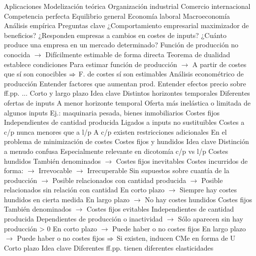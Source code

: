 \documentclass{nuevotema}
\begin{document}
\begin{esquemal}
		\2 Aplicaciones
			\3 Modelización teórica
				\4 Organización industrial
				\4 Comercio internacional
				\4 Competencia perfecta
				\4 Equilibrio general
				\4 Economía laboral
				\4 Macroeconomía
			\3 Análisis empírica
				\4 Preguntas clave
				\4[] ¿Comportamiento empresarial maximizador de beneficios?
				\4[] ¿Responden empresas a cambios en costes de inputs?
				\4[] ¿Cuánto produce una empresa en un mercado determinado?
				\4 Función de producción no conocida
				\4[] $\to$ Difícilmente estimable de forma directa
				\4 Teorema de dualidad establece condiciones
				\4[] Para estimar función de producción
				\4[] $\to$ A partir de costes que sí son conocibles
				\4[] $\Rightarrow$ F. de costes sí son estimables
				\4 Análisis econométrico de producción
				\4[] Entender factores que aumentan prod.
				\4[] Entender efectos precio sobre ff.pp.
				\4[] ...
	\1 
		\2 Corto y largo plazo
			\3 Idea clave
				\4 Distintos horizontes temporales
				\4[$\to$] Diferentes ofertas de inputs
				\4 A menor horizonte temporal
				\4[$\to$] Oferta más inelástica o limitada de algunos inputs
				\4[$\to$] Ej.: maquinaria pesada, bienes inmobiliarios
				\4 Costes fijos
				\4[] Independientes de cantidad producida
				\4[$\to$] Ligados a inputs no sustituibles
				\4 Costes a c/p nunca menores que a l/p
				\4[$\to$] A c/p existen restricciones adicionales
				\4[$\to$] En el problema de minimización de costes
			\3 Costes fijos y hundidos
				\4 Idea clave
				\4[] Distinción a menudo confusa
				\4[] Especialmente relevante en dicotomía c/p vs l/p
				\4 Costes hundidos
				\4[] También denominados
				\4[] $\to$ Costes fijos inevitables
				\4[] Costes incurridos de forma:
				\4[] $\to$ Irrevocable
				\4[] $\to$ Irrecuperable
				\4[] Sin supuestos sobre cuantía de la producción
				\4[] $\to$ Posible relacionados con cantidad producida
				\4[] $\to$ Posible relacionados sin relación con cantidad
				\4[] En corto plazo
				\4[] $\to$ Siempre hay costes hundidos en cierta medida
				\4[] En largo plazo
				\4[] $\to$ No hay costes hundidos
				\4 Costes fijos
				\4[] También denominados
				\4[] $\to$ Costes fijos evitables
				\4[] Independientes de cantidad producida
				\4[] Dependientes de producción o inactividad
				\4[] $\to$ Sólo aparecen sin hay producción > 0
				\4[] En corto plazo
				\4[] $\to$ Puede haber o no costes fijos
				\4[] En largo plazo
				\4[] $\to$ Puede haber o no costes fijos
				\4[] $\Rightarrow$ Si existen, inducen CMe en forma de U
			\3 Corto plazo
				\4 {Idea clave}
				\4[] Diferentes ff.pp. tienen diferentes elasticidades

\end{esquemal}
\end{document}
